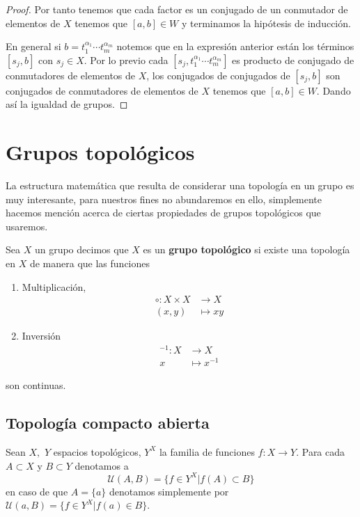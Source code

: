 \begin{proof}
Por tanto tenemos que cada factor es un conjugado  de un conmutador de elementos de $X$ tenemos que $[a,b] \in W$ y terminamos la hipótesis de inducción.

 En general si $b=t_1^{\alpha_1} \cdots t_m^{\alpha_m}$ notemos que en la expresión anterior están los términos $[s_j,b]$ con $s_j \in X$. Por lo previo cada $[s_j,t_1^{\alpha_1} \cdots t_m^{\alpha_m}]$ es producto de conjugado de conmutadores de elementos de $X$, los conjugados de conjugados de $[s_j,b]$ son  conjugados de conmutadores de elementos de $X$ tenemos que $[a,b] \in W.$ Dando así la igualdad de grupos. 

\end{proof}


\section*{Grupos topológicos}
La estructura matemática que resulta  de considerar una topología en un grupo es muy interesante, para nuestros fines no abundaremos en ello, simplemente hacemos mención acerca de ciertas propiedades de grupos topológicos que usaremos.  

\begin{df}
	Sea $X$ un grupo decimos que $X$ es un \textbf{grupo topológico} si existe una topología en $X$ de manera que las funciones 
	\begin{enumerate}
	\item  Multiplicación,
	\begin{align*}
	\circ : X \times X & \to X \\
	(x,y) & \mapsto xy
	\end{align*}
	
	\item Inversión
	\begin{align*}
	^{-1} : X & \to X \\
	x & \mapsto x^{-1}
	\end{align*}		
	 
	\end{enumerate}
son continuas.	
	\end{df}
	
\subsection*{Topología compacto abierta}	
Sean $X,$ $Y$ espacios topológicos, $Y^X$ la familia de funciones $f:X \to Y$. Para cada $A \subset X$ y $B \subset Y$ denotamos a $$\mathcal{U}(A,B)=\{f \in Y^X|f(A)\subset B \}$$ en caso de que $A=\{a\}$ denotamos  simplemente por $\mathcal{U}(a,B)=\{f \in Y^X|f(a) \in B\}$.

